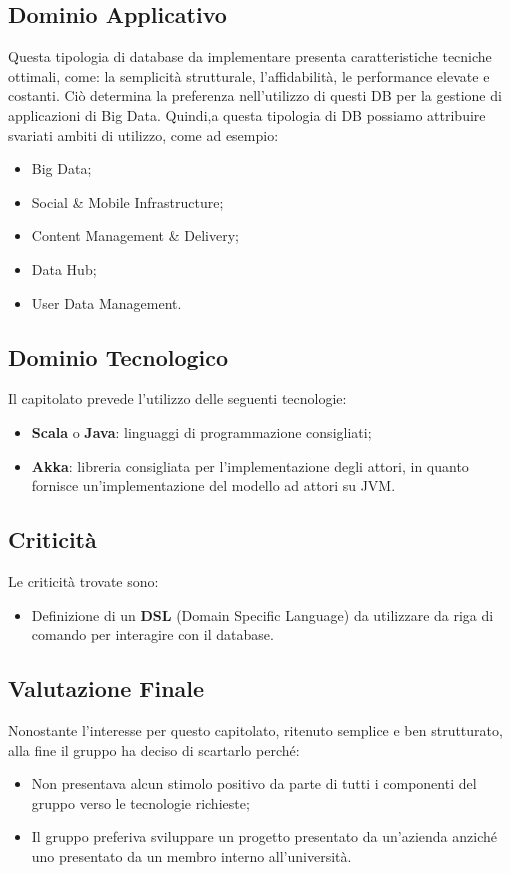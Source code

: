 \subsection{Dominio Applicativo}
Questa tipologia di database da implementare presenta caratteristiche tecniche ottimali, come: la semplicità strutturale, l'affidabilità, le performance elevate e costanti.
Ciò determina la preferenza nell'utilizzo di questi DB per la gestione di applicazioni di Big Data.
Quindi,a questa tipologia di DB possiamo attribuire svariati ambiti di utilizzo, come ad esempio:
\begin{itemize}
\item Big Data; 
\item Social \& Mobile Infrastructure;
\item Content Management \& Delivery;
\item Data Hub;
\item User Data Management. 
\end{itemize}

\subsection{Dominio Tecnologico}
Il capitolato prevede l'utilizzo delle seguenti tecnologie: 
\begin{itemize}
\item \textbf{Scala} o \textbf{Java}: linguaggi di programmazione consigliati;
\item \textbf{Akka}: libreria consigliata per l'implementazione degli attori, in quanto fornisce un'implementazione del modello ad attori su JVM.
\end{itemize}

\subsection{Criticità}
Le criticità trovate sono:
\begin{itemize}
\item Definizione di un \textbf{DSL} (Domain Specific Language) da utilizzare da riga di comando per interagire con il database.
\end{itemize}

\subsection{Valutazione Finale}
Nonostante l'interesse per questo capitolato, ritenuto semplice e ben strutturato, alla fine il gruppo ha deciso di scartarlo perché:
\begin{itemize}
\item Non presentava alcun stimolo positivo da parte di tutti i componenti del gruppo verso le tecnologie richieste;
\item Il gruppo preferiva sviluppare un progetto presentato da un'azienda anziché uno presentato da un membro interno all'università.
\end{itemize}
